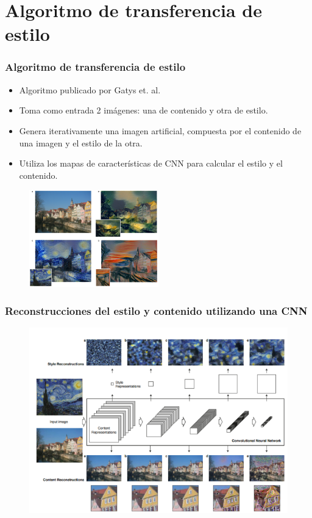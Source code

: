 \documentclass[10pt,center]{beamer}
\begin{document}
\section{Algoritmo de transferencia de estilo}
\begin{frame}
 \frametitle{Algoritmo de transferencia de estilo}
 \begin{itemize}
    \item Algoritmo publicado por Gatys et. al.
    \item Toma como entrada 2 imágenes: una de contenido y otra de estilo.
    \item Genera iterativamente una imagen artificial, compuesta por el contenido de una imagen y el estilo de la otra.
    \item Utiliza los mapas de características de CNN para calcular el estilo y el contenido.
 \end{itemize}
    \begin{figure}[h]
    \captionsetup[subfigure]{labelformat=empty}
    \begin{center}
     \includegraphics[width=0.5\textwidth]{./img/gatys_style_transfer.png}
    \end{center}
  \end{figure} 
\end{frame}

\begin{frame}
  \frametitle{Reconstrucciones del estilo y contenido utilizando una CNN}
   \begin{figure}[h]
   \captionsetup[subfigure]{labelformat=empty}
    \begin{center}
     \includegraphics[width=\textwidth]{./img/gatys_1.png}
    \end{center}
  \end{figure} 
\end{frame}
\end{document}
